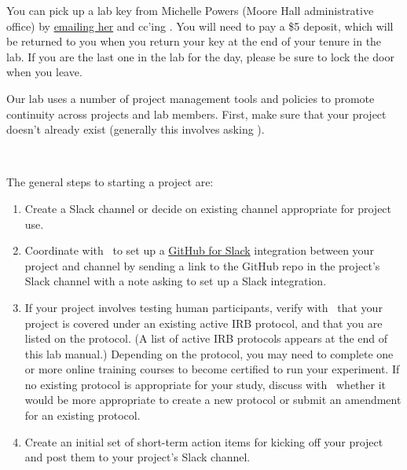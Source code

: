 \documentclass{tufte-book} %
\begin{document}

\noindent You can pick up a lab key from Michelle Powers (Moore Hall
administrative office) by
\href{mailto:Michelle.A.Powers@dartmouth.edu}{emailing her} and cc'ing
\director.  You will need to pay a \$5 deposit, which will be returned
to you when you return your key at the end of your tenure in the lab.
If you are the last one in the lab for the day, please be sure to lock the
door when you leave.




\noindent
Our lab uses a number of project management tools and policies to
promote continuity across projects and lab members.  First, make sure
that your project doesn't already exist (generally this involves
asking \director).

~

The general steps to starting a project are:
\begin{enumerate}

  \item Create a Slack channel or decide on existing channel
    appropriate for project use.
  \item Coordinate with \director~to set up a \href{https://get.slack.help/hc/en-us/articles/232289568-GitHub-for-Slack}{GitHub
      for Slack} integration between your project and channel by sending a link to the GitHub repo in the project's Slack channel with a note asking to set up a Slack integration.
   \item If your project involves testing human participants, verify
     with \director~that your project is covered under an existing
     active IRB protocol, and that you are listed on the protocol. (A list of
active IRB protocols appears at the end of this lab manual.)
Depending on the protocol, you may need to complete one or more online
training courses to become certified to run your experiment.  If no
existing protocol is appropriate for your study, discuss with
\director~whether it would be more appropriate to create a new protocol or
submit an amendment for an existing protocol.
    \item Create an initial set of short-term action items for kicking
      off your project and post them to your project's Slack channel.
\end{enumerate}
\end{document}
